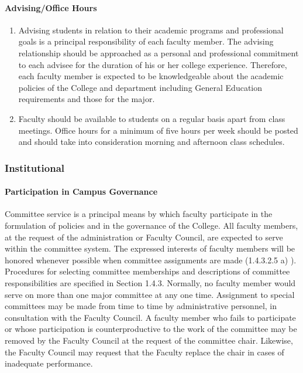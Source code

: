 \documentclass[letterpaper, 11pt]{article}
\begin{document}
			\paragraph{Advising/Office Hours}
				\begin{enumerate}[label=\alph*)]
					\item{Advising students in relation to their academic programs and professional goals is a principal responsibility of each faculty member.  The advising relationship should be approached as a personal and professional commitment to each advisee for the duration of his or her college experience.  Therefore, each faculty member is expected to be knowledgeable about the academic policies of the College and department including General Education requirements and those for the major.}
					\item{Faculty should be available to students on a regular basis apart from class meetings. Office hours for a minimum of five hours per week should be posted and should take into consideration morning and afternoon class schedules.}
				\end{enumerate}
		\subsubsection{Institutional}
			\paragraph{Participation in Campus Governance}
				Committee service is a principal means by which faculty participate in the formulation of policies and in the governance of the College.  All faculty members, at the request of the administration or Faculty Council, are expected to serve within the committee system.  The expressed interests of faculty members will be honored whenever possible when committee assignments are made (1.4.3.2.5 a) ).  Procedures for selecting committee memberships and descriptions of committee responsibilities are specified in Section 1.4.3.  Normally, no faculty member would serve on more than one major committee at any one time.  Assignment to special committees may be made from time to time by administrative personnel, in consultation with the Faculty Council.  A faculty member who fails to participate or whose participation is counterproductive to the work of the committee may be removed by the Faculty Council at the request of the committee chair.  Likewise, the Faculty Council may request that the Faculty replace the chair in cases of inadequate performance.
\end{document}
